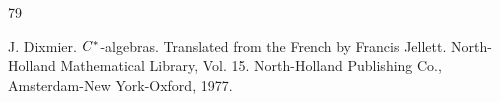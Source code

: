 \documentclass[leqno]{article} %
\numberwithin{equation}{section}
\begin{document}
\begin{thebibliography}{79}









J. Dixmier.
\newblock $C\sp*$-algebras. Translated from the French by Francis Jellett.
\newblock North-Holland Mathematical Library, Vol. 15. North-Holland Publishing Co., Amsterdam-New York-Oxford, 1977. 




\end{thebibliography}
\end{document}
